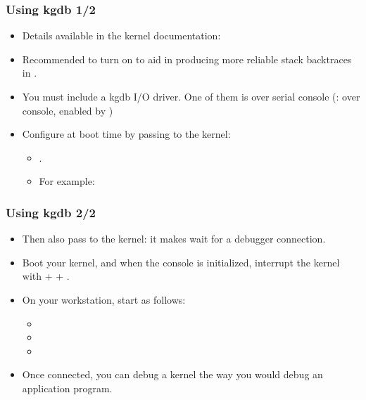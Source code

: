 \begin{frame}
  \frametitle{Using kgdb 1/2}
  \begin{itemize}
  \item Details available in the kernel documentation:
  \item Recommended to turn on  to aid in
    producing more reliable stack backtraces in .
  \item You must include a kgdb I/O driver. One of them is  over
    serial console (:  over console, enabled by
    )
  \item Configure  at boot time by passing to the kernel:
    \begin{itemize}
    \item {}.
    \item For example: 
    \end{itemize}
  \end{itemize}
\end{frame}

\begin{frame}
  \frametitle{Using kgdb 2/2}
  \begin{itemize}
  \item Then also pass  to the kernel: it makes
     wait for a debugger connection.
  \item Boot your kernel, and when the console is initialized,
    interrupt the kernel with  +  + .
  \item On your workstation, start  as follows:
    \begin{itemize}
    \item {}
    \item {}
    \item {}
    \end{itemize}
  \item Once connected, you can debug a kernel the way you would debug
    an application program.
  \end{itemize}
\end{frame}


